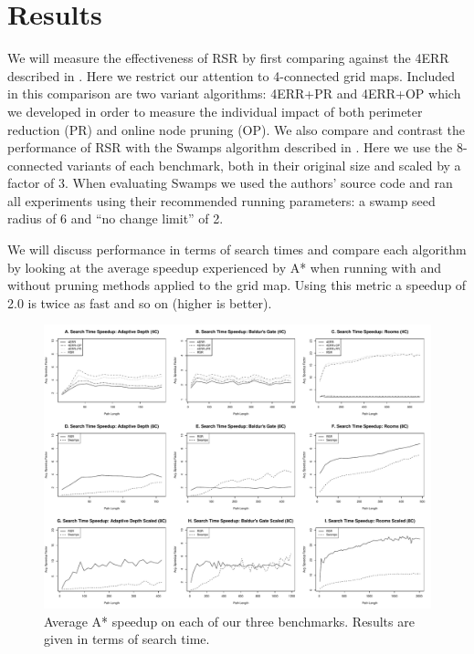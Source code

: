 \section{Results}
\label{sec-results}
We will measure the effectiveness of RSR by first comparing against the 4ERR
described in \cite{harabor10}. Here we restrict our attention to 4-connected
grid maps. Included in this comparison are two variant algorithms: 4ERR+PR and 
4ERR+OP which we developed in order to measure the individual impact of both
perimeter reduction (PR) and online node pruning (OP).
We also compare and contrast the performance of RSR
with the Swamps algorithm described in \cite{pochter10}.
Here we use the 8-connected variants of each benchmark, both in their original 
size and scaled by a factor of 3.
When evaluating Swamps we used the authors'
source code and ran all experiments using their recommended running parameters:
a swamp seed radius of 6 and ``no change limit'' of 2.  
\par 
We will discuss performance in terms of search times and compare each algorithm
by looking at the average speedup experienced by A* when running with and
without pruning methods applied to the grid map.  Using this metric a speedup of
2.0 is twice as fast and so on (higher is better).

\begin{figure}[t]
       \begin{center}
                       \includegraphics[width=1.90\columnwidth, trim = 10mm 10mm 10mm 0mm]{diagrams/speedup.pdf}
       \end{center}
       \caption{Average A* speedup on each of our three benchmarks. 
		Results are given in terms of search time.}
\label{fig-speedup}
\end{figure}

